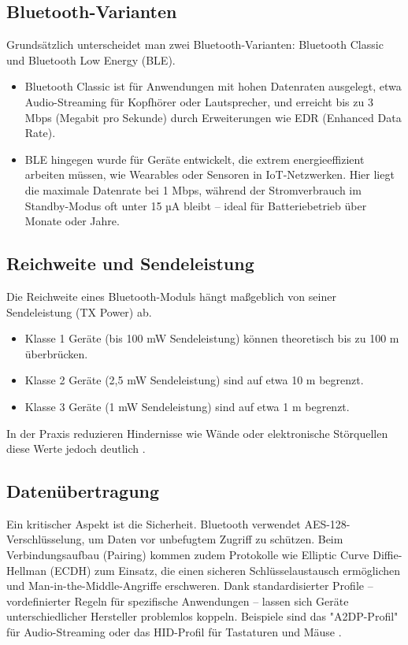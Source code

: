 \subsection{Bluetooth-Varianten}

Grundsätzlich unterscheidet man zwei Bluetooth-Varianten: 
Bluetooth Classic und Bluetooth Low Energy (BLE).

\begin{itemize}
	\item Bluetooth Classic ist für Anwendungen mit hohen Datenraten ausgelegt, etwa Audio-Streaming für Kopfhörer oder Lautsprecher, und erreicht bis zu 3 Mbps (Megabit pro Sekunde) durch Erweiterungen wie EDR (Enhanced Data Rate).

	\item BLE hingegen wurde für Geräte entwickelt, die extrem energieeffizient arbeiten müssen, wie Wearables oder Sensoren in IoT-Netzwerken. Hier liegt die maximale Datenrate bei 1 Mbps, während der Stromverbrauch im Standby-Modus oft unter 15 µA bleibt – ideal für Batteriebetrieb über Monate oder Jahre.

\end{itemize}

\subsection{Reichweite und Sendeleistung}

Die Reichweite eines Bluetooth-Moduls hängt maßgeblich von seiner Sendeleistung (TX Power) ab. 

\begin{itemize}
	\item Klasse 1 Geräte (bis 100 mW Sendeleistung)  können theoretisch bis zu 100 m überbrücken.
	\item Klasse 2 Geräte (2,5 mW Sendeleistung) sind auf  etwa 10 m begrenzt.
	\item Klasse 3 Geräte (1 mW Sendeleistung)  sind auf etwa 1 m begrenzt.
\end{itemize}

In der Praxis reduzieren Hindernisse wie Wände oder elektronische Störquellen diese Werte jedoch deutlich  \cite{Sauter:2022}.

\subsection{Datenübertragung}
Ein kritischer Aspekt ist die Sicherheit. Bluetooth verwendet AES-128-Verschlüsselung, um Daten vor unbefugtem Zugriff zu schützen. Beim Verbindungsaufbau (Pairing) kommen zudem Protokolle wie Elliptic Curve Diffie-Hellman (ECDH) zum Einsatz, die einen sicheren Schlüsselaustausch ermöglichen und Man-in-the-Middle-Angriffe erschweren. Dank standardisierter Profile – vordefinierter Regeln für spezifische Anwendungen – lassen sich Geräte unterschiedlicher Hersteller problemlos koppeln. Beispiele sind das "A2DP-Profil" für Audio-Streaming oder das HID-Profil für Tastaturen und Mäuse \cite{Sauter:2022}.

